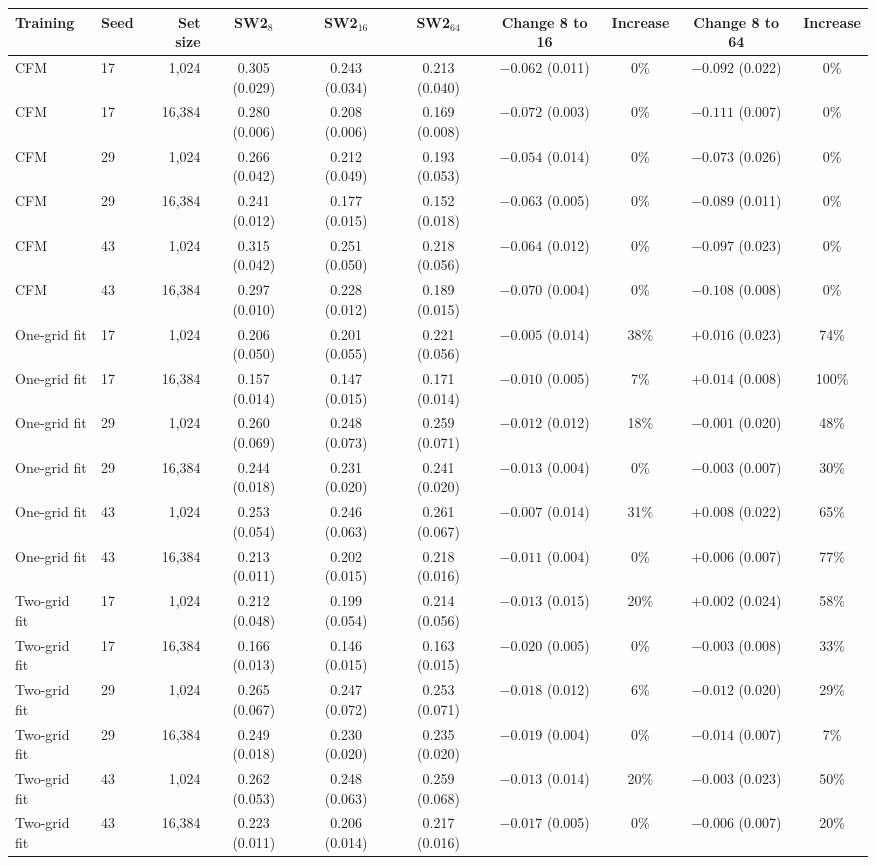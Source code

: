 \begin{tabular}{@{}llrccccccc@{}}
\toprule
Training & Seed & Set size & SW2$_8$ & SW2$_{16}$ & SW2$_{64}$ & Change 8 to 16 & Increase & Change 8 to 64 & Increase\\
\midrule
CFM & 17 & 1,024 & 0.305 (0.029) & 0.243 (0.034) & 0.213 (0.040) & $-0.062$ (0.011) & 0\% & $-0.092$ (0.022) & 0\%\\
CFM & 17 & 16,384 & 0.280 (0.006) & 0.208 (0.006) & 0.169 (0.008) & $-0.072$ (0.003) & 0\% & $-0.111$ (0.007) & 0\%\\
\addlinespace
CFM & 29 & 1,024 & 0.266 (0.042) & 0.212 (0.049) & 0.193 (0.053) & $-0.054$ (0.014) & 0\% & $-0.073$ (0.026) & 0\%\\
CFM & 29 & 16,384 & 0.241 (0.012) & 0.177 (0.015) & 0.152 (0.018) & $-0.063$ (0.005) & 0\% & $-0.089$ (0.011) & 0\%\\
\addlinespace
CFM & 43 & 1,024 & 0.315 (0.042) & 0.251 (0.050) & 0.218 (0.056) & $-0.064$ (0.012) & 0\% & $-0.097$ (0.023) & 0\%\\
CFM & 43 & 16,384 & 0.297 (0.010) & 0.228 (0.012) & 0.189 (0.015) & $-0.070$ (0.004) & 0\% & $-0.108$ (0.008) & 0\%\\
\addlinespace
One-grid fit & 17 & 1,024 & 0.206 (0.050) & 0.201 (0.055) & 0.221 (0.056) & $-0.005$ (0.014) & 38\% & $+0.016$ (0.023) & 74\%\\
One-grid fit & 17 & 16,384 & 0.157 (0.014) & 0.147 (0.015) & 0.171 (0.014) & $-0.010$ (0.005) & 7\% & $+0.014$ (0.008) & 100\%\\
\addlinespace
One-grid fit & 29 & 1,024 & 0.260 (0.069) & 0.248 (0.073) & 0.259 (0.071) & $-0.012$ (0.012) & 18\% & $-0.001$ (0.020) & 48\%\\
One-grid fit & 29 & 16,384 & 0.244 (0.018) & 0.231 (0.020) & 0.241 (0.020) & $-0.013$ (0.004) & 0\% & $-0.003$ (0.007) & 30\%\\
\addlinespace
One-grid fit & 43 & 1,024 & 0.253 (0.054) & 0.246 (0.063) & 0.261 (0.067) & $-0.007$ (0.014) & 31\% & $+0.008$ (0.022) & 65\%\\
One-grid fit & 43 & 16,384 & 0.213 (0.011) & 0.202 (0.015) & 0.218 (0.016) & $-0.011$ (0.004) & 0\% & $+0.006$ (0.007) & 77\%\\
\addlinespace
Two-grid fit & 17 & 1,024 & 0.212 (0.048) & 0.199 (0.054) & 0.214 (0.056) & $-0.013$ (0.015) & 20\% & $+0.002$ (0.024) & 58\%\\
Two-grid fit & 17 & 16,384 & 0.166 (0.013) & 0.146 (0.015) & 0.163 (0.015) & $-0.020$ (0.005) & 0\% & $-0.003$ (0.008) & 33\%\\
\addlinespace
Two-grid fit & 29 & 1,024 & 0.265 (0.067) & 0.247 (0.072) & 0.253 (0.071) & $-0.018$ (0.012) & 6\% & $-0.012$ (0.020) & 29\%\\
Two-grid fit & 29 & 16,384 & 0.249 (0.018) & 0.230 (0.020) & 0.235 (0.020) & $-0.019$ (0.004) & 0\% & $-0.014$ (0.007) & 7\%\\
\addlinespace
Two-grid fit & 43 & 1,024 & 0.262 (0.053) & 0.248 (0.063) & 0.259 (0.068) & $-0.013$ (0.014) & 20\% & $-0.003$ (0.023) & 50\%\\
Two-grid fit & 43 & 16,384 & 0.223 (0.011) & 0.206 (0.014) & 0.217 (0.016) & $-0.017$ (0.005) & 0\% & $-0.006$ (0.007) & 20\%\\
\bottomrule
\end{tabular}
